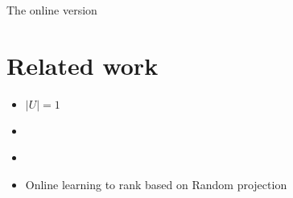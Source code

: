 \documentclass{article}
\begin{document}
The online version

\section{Related work}

\begin{itemize}
	\item \cite{Ailon-2014} $|U| =1 $
	\item \cite{Azar-Gamzu-Yin-2009}
	\item \cite{Radlinski-Kleinberg-Joachims-2008}
	\item Online learning to rank based on Random projection \cite{Schuth-Oosterhuis-Whiteson-de-Rijke-2016}
\end{itemize}



\end{document}
